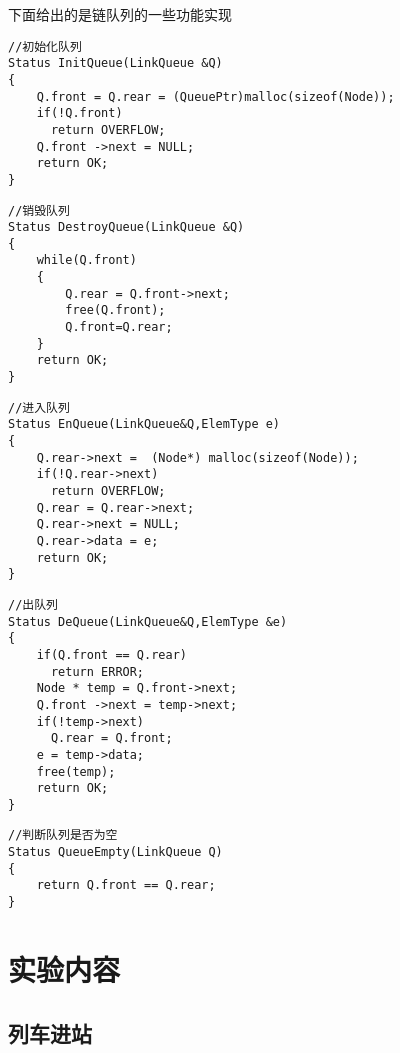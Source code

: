 \documentclass[a4paper,11pt]{article}%
\begin{document}
下面给出的是链队列的一些功能实现
\begin{lstlisting}[language={[ANSI]C},keywordstyle=\color{blue!70},commentstyle=\color{red!50!green!50!blue!50},frame=shadowbox,
				rulesepcolor=\color{red!20!green!20!blue!20}]
//初始化队列
Status InitQueue(LinkQueue &Q)
{
	Q.front = Q.rear = (QueuePtr)malloc(sizeof(Node));
	if(!Q.front)
	  return OVERFLOW; 
	Q.front ->next = NULL;
	return OK;
}
\end{lstlisting}
\begin{lstlisting}[language={[ANSI]C},keywordstyle=\color{blue!70},commentstyle=\color{red!50!green!50!blue!50},frame=shadowbox,
				rulesepcolor=\color{red!20!green!20!blue!20}]
//销毁队列
Status DestroyQueue(LinkQueue &Q)
{
	while(Q.front)
	{
		Q.rear = Q.front->next;
		free(Q.front);
		Q.front=Q.rear;
	}
	return OK;
}
\end{lstlisting}
\begin{lstlisting}[language={[ANSI]C},keywordstyle=\color{blue!70},commentstyle=\color{red!50!green!50!blue!50},frame=shadowbox,
				rulesepcolor=\color{red!20!green!20!blue!20}]
//进入队列
Status EnQueue(LinkQueue&Q,ElemType e)
{
	Q.rear->next =  (Node*) malloc(sizeof(Node));
	if(!Q.rear->next)
	  return OVERFLOW;
	Q.rear = Q.rear->next;
	Q.rear->next = NULL;
	Q.rear->data = e;
	return OK;
}
\end{lstlisting}

\begin{lstlisting}[language={[ANSI]C},keywordstyle=\color{blue!70},commentstyle=\color{red!50!green!50!blue!50},frame=shadowbox,
				rulesepcolor=\color{red!20!green!20!blue!20}]
//出队列
Status DeQueue(LinkQueue&Q,ElemType &e)
{
	if(Q.front == Q.rear)
	  return ERROR;
	Node * temp = Q.front->next;
	Q.front ->next = temp->next;
	if(!temp->next)
	  Q.rear = Q.front;
	e = temp->data;
	free(temp);
	return OK;
}
\end{lstlisting}

\begin{lstlisting}[language={[ANSI]C},keywordstyle=\color{blue!70},commentstyle=\color{red!50!green!50!blue!50},frame=shadowbox,
				rulesepcolor=\color{red!20!green!20!blue!20}]
//判断队列是否为空
Status QueueEmpty(LinkQueue Q)
{
	return Q.front == Q.rear;
}
\end{lstlisting}
\section{实验内容}
\subsection{列车进站}
\end{document}
